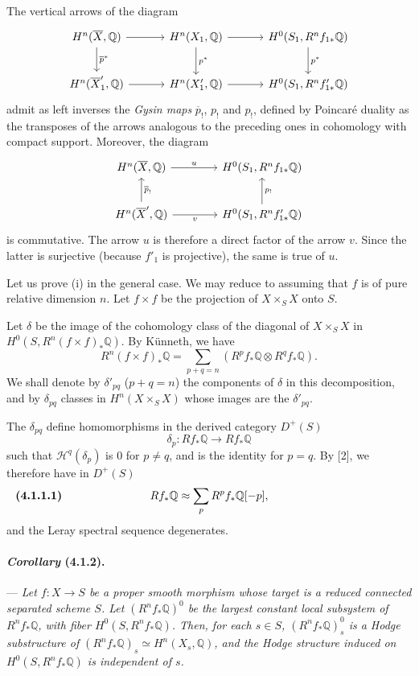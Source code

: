 \documentclass[10pt]{article}
\newcommand{\Q}{\mathbb Q}
\begin{document}
The vertical arrows of the diagram
\[
\begin{tikzcd}[column sep=3.2em,row sep=2.2em]
H^n(\overline X,\Q) \arrow[r] \arrow[d,"\overline p^*"] &
H^n(X_1,\Q) \arrow[r] \arrow[d,"p^*"] &
H^0(S_1,R^nf_{1*}\Q) \arrow[d,"p^*"]\\
H^n(\overline X'_1,\Q) \arrow[r] &
H^n(X'_1,\Q) \arrow[r] &
H^0(S_1,R^nf'_{1*}\Q)
\end{tikzcd}
\]
admit as left inverses the \emph{Gysin maps} $\overline p_!$, $p_!$ and $p_!$, defined by Poincaré duality as the transposes of the arrows analogous to the preceding ones in cohomology with compact support. Moreover, the diagram
\[
\begin{tikzcd}[column sep=4em,row sep=2.2em]
H^n(\overline X,\Q) \arrow[r,"u"] &
H^0(S_1,R^nf_{1*}\Q)\\
H^n(\overline X',\Q) \arrow[u,"\overline p_!"'] \arrow[r,"v"'] &
H^0(S_1,R^nf'_{1*}\Q) \arrow[u,"p_!"']
\end{tikzcd}
\]
is commutative. The arrow $u$ is therefore a direct factor of the arrow $v$. Since the latter is surjective (because $f'_1$ is projective), the same is true of $u$.

Let us prove (i) in the general case. We may reduce to assuming that $f$ is of pure relative dimension $n$. Let $f\times f$ be the projection of $X\times_SX$ onto $S$.

Let $\delta$ be the image of the cohomology class of the diagonal of $X\times_SX$ in $H^0(S,R^n(f\times f)_*\Q)$. By Künneth, we have
\[
R^n(f\times f)_*\Q=
\sum_{p+q=n}(R^pf_*\Q\otimes R^qf_*\Q).
\]
We shall denote by $\delta'_{pq}$ ($p+q=n$) the components of $\delta$ in this decomposition, and by $\delta_{pq}$ classes in $H^n(X\times_SX)$ whose images are the $\delta'_{pq}$.

The $\delta_{pq}$ define homomorphisms in the derived category $D^+(S)$
\[
\delta_p:Rf_*\Q\longrightarrow Rf_*\Q
\]
such that $\mathcal H^q(\delta_p)$ is $0$ for $p\ne q$, and is the identity for $p=q$. By [2], we therefore have in $D^+(S)$
\[
\makebox[\textwidth][s]{\textbf{(4.1.1.1)}\hfill$\displaystyle Rf_*\Q\approx\sum_p R^pf_*\Q[-p],$\hfill\phantom{\textbf{(4.1.1.1)}}}
\]
and the Leray spectral sequence degenerates.

\paragraph{\emph{Corollary} (4.1.2).} --- {\itshape Let $f:X\to S$ be a proper smooth morphism whose target is a reduced connected separated scheme $S$. Let $(R^nf_*\Q)^0$ be the largest constant local subsystem of $R^nf_*\Q$, with fiber $H^0(S,R^nf_*\Q)$. Then, for each $s\in S$, $(R^nf_*\Q)^0_s$ is a Hodge substructure of $(R^nf_*\Q)_s\simeq H^n(X_s,\Q)$, and the Hodge structure induced on $H^0(S,R^nf_*\Q)$ is independent of $s$.}
\end{document}
